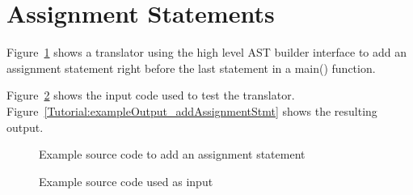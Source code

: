 \clearpage
\section{Assignment Statements}
Figure~\ref{Tutorial:exampleAddAssign} shows a translator
using the high level AST builder interface to add an assignment statement right
before the last statement in a main() function.  

   Figure~\ref{Tutorial:exampleInputCode_addAssignmentStmt} shows the
input code used to test the translator.
Figure~\ref{Tutorial:exampleOutput_addAssignmentStmt} shows the resulting output.

\begin{figure}[!ht]
{\indent
{\mySmallFontSize


\begin{latexonly}
   
\end{latexonly}

\begin{htmlonly}
   
\end{htmlonly}

}
}
\caption{Example source code to add an assignment statement}
\label{Tutorial:exampleAddAssign}
\end{figure}

\begin{figure}[!ht]
{\indent
{\mySmallFontSize
\begin{latexonly}
   
\end{latexonly}

\begin{htmlonly}
   
\end{htmlonly}

}
}
\caption{Example source code used as input}
\label{Tutorial:exampleInputCode_addAssignmentStmt}
\end{figure}


